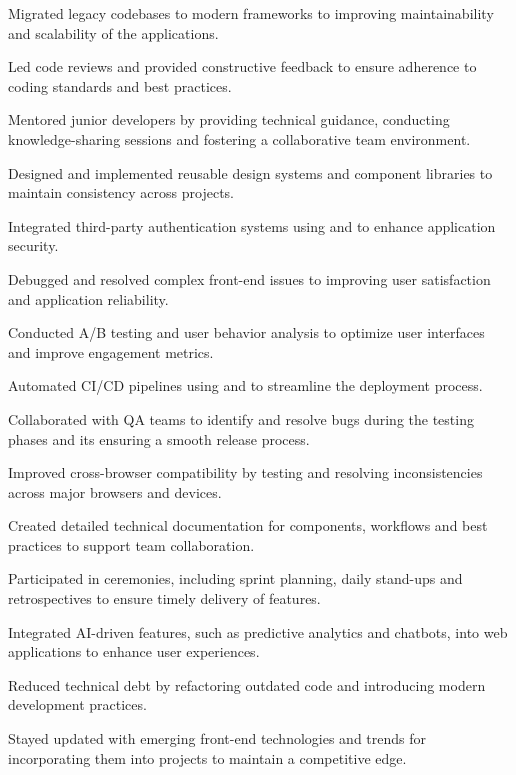 \begin{cventries}
{\begin{cvitems}
        \item {Migrated legacy codebases to modern frameworks to improving maintainability and scalability of the applications.}
        \item {Led code reviews and provided constructive feedback to ensure adherence to coding standards and best practices.}
        \item {Mentored junior developers by providing technical guidance, conducting knowledge-sharing sessions and fostering a collaborative team environment.}
        \item {Designed and implemented reusable design systems and component libraries to maintain consistency across projects.}
        \item {Integrated third-party authentication systems using  and  to enhance application security.}
        \item {Debugged and resolved complex front-end issues to improving user satisfaction and application reliability.}
        \item {Conducted A/B testing and user behavior analysis to optimize user interfaces and improve engagement metrics.}
        \item {Automated CI/CD pipelines using  and  to streamline the deployment process.}
        \item {Collaborated with QA teams to identify and resolve bugs during the testing phases and its ensuring a smooth release process.}
        \item {Improved cross-browser compatibility by testing and resolving inconsistencies across major browsers and devices.}
        \item {Created detailed technical documentation for components, workflows and best practices to support team collaboration.}
        \item {Participated in  ceremonies, including sprint planning, daily stand-ups and retrospectives to ensure timely delivery of features.}
        \item {Integrated AI-driven features, such as predictive analytics and chatbots, into web applications to enhance user experiences.}
        \item {Reduced technical debt by refactoring outdated code and introducing modern development practices.}
        \item {Stayed updated with emerging front-end technologies and trends for incorporating them into projects to maintain a competitive edge.}

\end{cvitems}}
\end{cventries}
